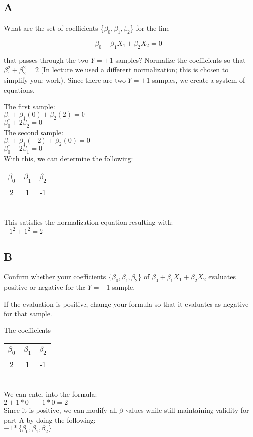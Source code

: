 \documentclass[12pt]{article}
\begin{document}
\subsection{A}
What are the set of coefficients \{$\beta_0, \beta_1, \beta_2$\} for the line
\begin{center}
    \[
        \beta_0 + \beta_1X_1 +\beta_2X_2 = 0
    \]
\end{center}
that passes through the two $Y = +1$ samples? Normalize the coefficients so that $\beta_1^2 + \beta_2^2 = 2$ (In lecture we used a different normalization; this is chosen to simplify your work).
\newline
Since there are two $ Y = +1$ samples, we create a system of equations.
\begin{center}
    The first sample:\\ $\beta_1 + \beta_1(0) + \beta_2(2) = 0$\\
    $\beta_0 + 2\beta_2 = 0$\\
    The second sample:\\ $\beta_1 + \beta_1(-2) + \beta_2(0) = 0$\\
    $\beta_0 - 2\beta_1 = 0$\\

    With this, we can determine the following:
    \begin{tabular}{ |c|c|c| }
        \hline
        $\beta_0$ & $\beta_1$ & $\beta_2$ \\
        \hline
        2         & 1         & -1        \\
        \hline
    \end{tabular}\\
    This satisfies the normalization equation resulting with:\\${-1}^2+1^2=2$
\end{center}
\subsection{B}
Confirm whether your coefficients \{$\beta_0, \beta_1, \beta_2$\} of $\beta_0 + \beta_1X_1 +\beta_2X_2$ evaluates positive or negative for the $Y = -1$ sample.


If the evaluation is positive, change your formula so that it evaluates as negative for that sample.

\begin{center}

    The coefficients\\
    \begin{tabular}{ |c|c|c| }
        \hline
        $\beta_0$ & $\beta_1$ & $\beta_2$ \\
        \hline
        2         & 1         & -1        \\
        \hline
    \end{tabular}\\
    We can enter into the formula:\\
    $2 + 1 * 0 + -1 * 0 = 2$\\
    Since it is positive, we can modify all $\beta$ values while still maintaining validity for part A by doing the following:\\$-1 * \{\beta_0, \beta_1, \beta_2\}$
\end{center}
\end{document}
